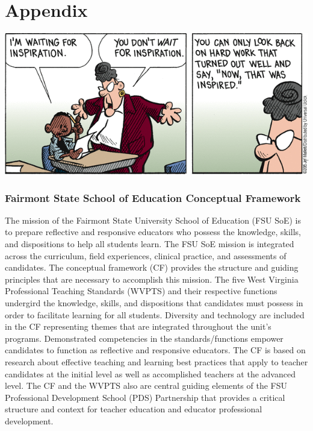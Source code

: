 \documentclass{tufte-handout}
\begin{document}
\part{Appendix}
\begin{marginfigure}%
	\begin{center}
  \includegraphics[width=1\linewidth]{frazz-inspiration.png}
  \label{fig:ap-pic}
	\end{center}
\end{marginfigure}
\section{Fairmont State School of Education Conceptual Framework}
The mission of the Fairmont State University School of Education (FSU SoE) is to prepare reflective and responsive educators who possess the knowledge, skills, and dispositions to help all students learn. The FSU SoE mission is integrated across the curriculum, field experiences, clinical practice, and assessments of candidates. The conceptual framework (CF) provides the structure and guiding principles that are necessary to accomplish this mission. The five West Virginia Professional Teaching Standards (WVPTS) and their respective functions undergird the knowledge, skills, and dispositions that candidates must possess in order to facilitate learning for all students. Diversity and technology are included in the CF representing themes that are integrated throughout the unit's programs. Demonstrated competencies in the standards/functions empower candidates to function as reflective and responsive educators. The CF is based on research about effective teaching and learning best practices that apply to teacher candidates at the initial level as well as accomplished teachers at the advanced level. The CF and the WVPTS also are central guiding elements of the FSU Professional Development School (PDS) Partnership that provides a critical structure and context for teacher education and educator professional development.
\end{document}
